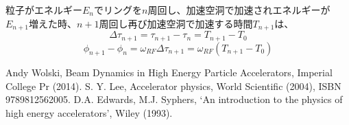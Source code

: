 \documentclass[10pt,a4paper]{ltjsarticle}
\begin{document}
粒子がエネルギー$E_n$でリングを$n$周回し、加速空洞で加速されエネルギーが$E_{n+1}$増えた時、$n+1$周回し再び加速空洞で加速する時間$T_{n+1}$は、
%
\begin{equation}
    \Delta \tau_{n+1} = \tau_{n+1} - \tau_{n} = T_{n+1} - T_0
\end{equation}
%
\begin{equation}
    \phi_{n+1} - \phi_{n} = \omega_{RF} \Delta\tau_{n+1} = \omega_{RF} (T_{n+1}-T_0)
\end{equation}
\begin{thebibliography}{9}
    Andy Wolski, Beam Dynamics in High Energy Particle Accelerators,  Imperial College Pr (2014).
    S. Y. Lee, Accelerator physics, World Scientific (2004), ISBN 9789812562005.
    D.A. Edwards, M.J. Syphers, `An introduction to the physics of high energy accelerators', Wiley (1993).
\end{thebibliography}
%
\end{document}
